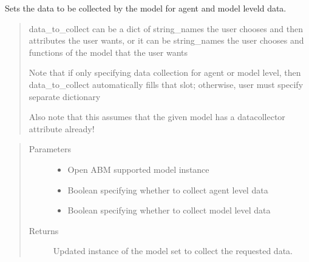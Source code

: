 \documentclass[letterpaper,10pt,english]{sphinxmanual}
\begin{document}

\begin{fulllineitems}
\label{\detokenize{index:oabm_tools.set_data_collection}}
Sets the data to be collected by the model for agent and model leveld data.
\begin{quote}

data\_to\_collect can be a dict of string\_names the user chooses and then attributes the user wants, or
it can be string\_names the user chooses and functions of the model that the user wants

Note that if only specifying data collection for agent or model level, then data\_to\_collect automatically fills that slot;
otherwise, user must specify separate dictionary

Also note that this assumes that the given model has a datacollector attribute already!
\end{quote}
\begin{quote}\begin{description}
\item[{Parameters}] \leavevmode\begin{itemize}
\item {} 
 \textendash{} Open ABM supported model instance

\item {} 
 \textendash{} Boolean specifying whether to collect agent level data

\item {} 
 \textendash{} Boolean specifying whether to collect model level data

\end{itemize}

\item[{Returns}] \leavevmode
Updated instance of the model set to collect the requested data.

\end{description}\end{quote}

\end{fulllineitems}
\end{document}

